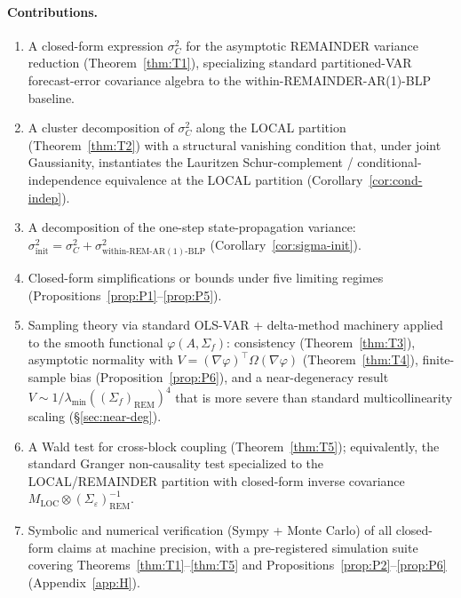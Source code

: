\documentclass[11pt,letterpaper]{article}
\theoremstyle{remark}
\newcommand{\REM}{\mathrm{REM}}
\newcommand{\LOC}{\mathrm{LOC}}
\newcommand{\Sigmaf}{\Sigma_f}
\newcommand{\Sigmae}{\Sigma_\varepsilon}
\newcommand{\Mloc}{M_{\LOC}}
\begin{document}
\paragraph{Contributions.}
\begin{enumerate}[label=(\roman*),leftmargin=1.5em,itemsep=0.1em]
\item A closed-form expression $\sigma^2_C$ for the asymptotic REMAINDER variance reduction (Theorem~\ref{thm:T1}), specializing standard partitioned-VAR forecast-error covariance algebra to the within-REMAINDER-AR(1)-BLP baseline.
\item A cluster decomposition of $\sigma^2_C$ along the LOCAL partition (Theorem~\ref{thm:T2}) with a structural vanishing condition that, under joint Gaussianity, instantiates the Lauritzen \cite{Lauritzen1996} Schur-complement / conditional-independence equivalence at the LOCAL partition (Corollary~\ref{cor:cond-indep}).
\item A decomposition of the one-step state-propagation variance: $\sigma^2_{\mathrm{init}} = \sigma^2_C + \sigma^2_{\mathrm{within\text{-}REM\text{-}AR(1)\text{-}BLP}}$ (Corollary~\ref{cor:sigma-init}).
\item Closed-form simplifications or bounds under five limiting regimes (Propositions~\ref{prop:P1}--\ref{prop:P5}).
\item Sampling theory via standard OLS-VAR + delta-method machinery applied to the smooth functional $\varphi(A, \Sigma_f)$: consistency (Theorem~\ref{thm:T3}), asymptotic normality with $V = (\nabla \varphi)^\top \Omega (\nabla \varphi)$ (Theorem~\ref{thm:T4}), finite-sample bias (Proposition~\ref{prop:P6}), and a near-degeneracy result $V \sim 1/\lambda_{\min}((\Sigmaf)_\REM)^4$ that is more severe than standard multicollinearity scaling (\S\ref{sec:near-deg}).
\item A Wald test for cross-block coupling (Theorem~\ref{thm:T5}); equivalently, the standard Granger non-causality test specialized to the LOCAL/REMAINDER partition with closed-form inverse covariance $\Mloc \otimes (\Sigmae)_\REM^{-1}$.
\item Symbolic and numerical verification (Sympy + Monte Carlo) of all closed-form claims at machine precision, with a pre-registered simulation suite covering Theorems~\ref{thm:T1}--\ref{thm:T5} and Propositions~\ref{prop:P2}--\ref{prop:P6} (Appendix~\ref{app:H}).
\end{enumerate}
\end{document}
